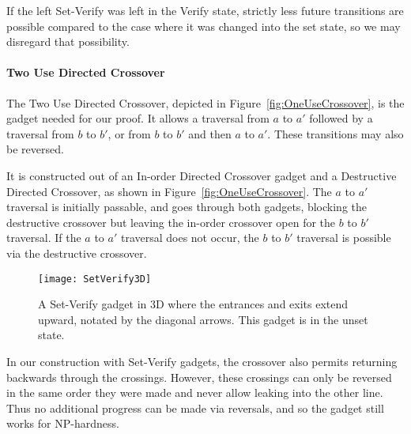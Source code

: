 If the left Set-Verify was left in the Verify state, strictly less future transitions are possible compared to the case where it was changed into the set state, so we may disregard that possibility.


\paragraph{Two Use Directed Crossover} 
The Two Use Directed Crossover, depicted in Figure~\ref{fig:OneUseCrossover}, is the gadget needed for our proof. It allows a traversal from $a$ to $a'$ followed by a traversal from $b$ to $b'$, or from $b$ to $b'$ and then $a$ to $a'$. These transitions may also be reversed.

It is constructed out of an In-order Directed Crossover gadget and a Destructive Directed Crossover, as shown in Figure~\ref{fig:OneUseCrossover}. The $a$ to $a'$ traversal is initially passable, and goes through both gadgets,
blocking the destructive crossover but leaving the in-order crossover open for the $b$ to $b'$ traversal. If the $a$ to $a'$ traversal does not occur, the $b$ to $b'$ traversal is possible via the destructive crossover.


\begin{wrapfigure}{hr}{0.45\textwidth}
\vspace{-5mm}
  \centering
    \texttt{[image: SetVerify3D]}
    \caption{A Set-Verify gadget in 3D where the entrances and exits extend upward, notated by the diagonal arrows. This gadget is in the unset state.}
    \label{fig:3DSetVerify}
    \vspace{-12mm}
\end{wrapfigure}


In our construction with Set-Verify gadgets, the crossover also permits returning backwards through the crossings. However, these crossings can only be reversed in the same order they were made and never allow leaking into the other line. Thus no additional progress can be made via reversals, and so the gadget still works for NP-hardness.
%


